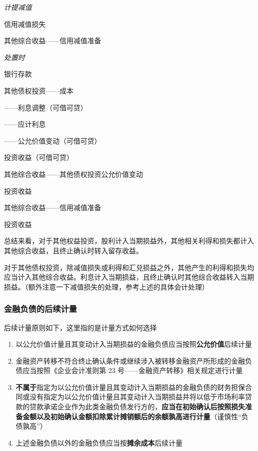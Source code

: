 \documentclass[UTF8,12pt]{ctexart}
\newenvironment{Dr}{%
	\begin{list}{}%
		{
			\setlength{\leftmargin}{2em}
			\setlength{\labelwidth}{2em}
			\setlength{\labelsep}{0pt}
			\setlength{\itemindent}{0pt}
			\setlength{\listparindent}{0pt}
			\setlength{\parsep}{0pt}
			\setlength{\topsep}{0pt}
		}
		\item[\textbf{借：}]
	}{%
	\end{list}
}
\newenvironment{Cr}{%
	\begin{list}{}%
		{
			\setlength{\leftmargin}{3em}
			\setlength{\labelwidth}{2em}
			\setlength{\labelsep}{0pt}
			\setlength{\itemindent}{0pt}
			\setlength{\listparindent}{0pt}
			\setlength{\parsep}{0pt}
			\setlength{\topsep}{0pt}
		}
		\item[\textbf{贷：}]
	}{%
	\end{list}
}
\numberwithin{equation}{section} %
\numberwithin{figure}{section}
\numberwithin{table}{section}
\begin{document}
	
	\textit{计提减值}
	
	\begin{Dr}
		信用减值损失
	\end{Dr}
	\begin{Cr}
		其他综合收益——信用减值准备
	\end{Cr}

	
	\textit{处置时}
	
	\begin{Dr}
		银行存款
	\end{Dr}
	\begin{Cr}
		其他债权投资——成本
		
		——利息调整（可借可贷）
		
		——应计利息
		
		——公允价值变动（可借可贷） 
		
		投资收益（可借可贷）
	\end{Cr}

	\begin{Dr}
		其他综合收益——其他债权投资公允价值变动
	\end{Dr}
	\begin{Cr}
		投资收益
	\end{Cr}
	
	\begin{Dr}
		其他综合收益——信用减值准备
	\end{Dr}
	\begin{Cr}
		投资收益
	\end{Cr}
	
	
	总结来看，对于其他权益投资，股利计入当期损益外，其他相关利得和损失都计入其他综合收益，且终止确认时转入留存收益。
	
	对于其他债权投资，除减值损失或利得和汇兑损益之外，其他产生的利得和损失均应当计入其他综合收益。利息计入当期损益，且终止确认时其他综合收益转入当期损益。（额外注意一下减值损失的处理，参考上述的具体会计处理）
	
	
	\subsubsection{金融负债的后续计量}
	后续计量原则如下，这里指的是计量方式如何选择
	\begin{enumerate}
		\item 以公允价值计量且其变动计入当期损益的金融负债应当按照\textbf{公允价值}后续计量
		
		\item 金融资产转移不符合终止确认条件或继续涉入被转移金融资产所形成的金融负债应当按照《企业会计准则第 23 号——金融资产转移》相关规定进行计量
		
		\item \textbf{不属于}指定为以公允价值计量且其变动计入当期损益的金融负债的财务担保合同或没有指定为以公允价值计量且其变动计入当期损益并将以低于市场利率贷款的贷款承诺企业作为此类金融负债发行方的，\textbf{应当在初始确认后按照损失准备金额以及初始确认金额扣除累计摊销额后的余额孰高进行计量}（谨慎性“负债孰高”）
		
		\item 上述金融负债以外的金融负债应当按\textbf{摊余成本}后续计量
	\end{enumerate}
	
\end{document}
